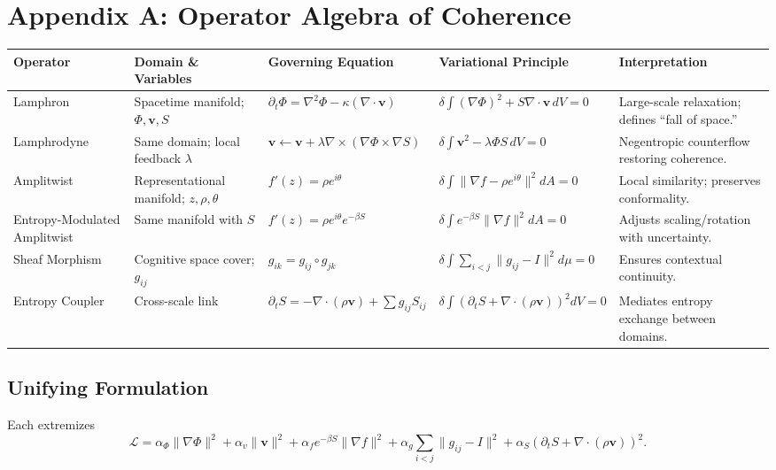 \documentclass[11pt]{article}
\begin{document}
\section*{Appendix A: Operator Algebra of Coherence}
\begin{center}
\begin{tabular}{@{}p{3cm}p{3cm}p{4cm}p{4cm}p{4cm}@{}}
\toprule
\textbf{Operator} & \textbf{Domain \& Variables} & \textbf{Governing Equation} & \textbf{Variational Principle} & \textbf{Interpretation} \\
\midrule
Lamphron & Spacetime manifold; $\Phi, \mathbf{v}, S$ & $\partial_t \Phi = \nabla^2 \Phi - \kappa (\nabla \cdot \mathbf{v})$ & $\delta \!\int (\nabla \Phi)^2 + S \nabla\!\cdot\!\mathbf{v}\,dV = 0$ & Large-scale relaxation; defines ``fall of space.'' \\
Lamphrodyne & Same domain; local feedback $\lambda$ & $\mathbf{v} \leftarrow \mathbf{v} + \lambda \nabla \times (\nabla \Phi \times \nabla S)$ & $\delta \!\int \mathbf{v}^2 - \lambda \Phi S\,dV = 0$ & Negentropic counterflow restoring coherence. \\
Amplitwist & Representational manifold; $z, \rho, \theta$ & $f'(z) = \rho e^{i\theta}$ & $\delta \!\int \|\nabla f - \rho e^{i\theta}\|^2 dA = 0$ & Local similarity; preserves conformality. \\
Entropy-Modulated Amplitwist & Same manifold with $S$ & $f'(z) = \rho e^{i\theta} e^{-\beta S}$ & $\delta \!\int e^{-\beta S} \|\nabla f\|^2 dA = 0$ & Adjusts scaling/rotation with uncertainty. \\
Sheaf Morphism & Cognitive space cover; $g_{ij}$ & $g_{ik} = g_{ij} \circ g_{jk}$ & $\delta \!\int \sum_{i<j}\!\!\|g_{ij}-I\|^2 d\mu = 0$ & Ensures contextual continuity. \\
Entropy Coupler & Cross-scale link & $\partial_t S = -\nabla\!\cdot(\rho \mathbf{v}) + \sum g_{ij} S_{ij}$ & $\delta \!\int (\partial_t S + \nabla\!\cdot(\rho \mathbf{v}))^2 dV = 0$ & Mediates entropy exchange between domains. \\
\bottomrule
\end{tabular}
\end{center}

\subsection*{Unifying Formulation}
Each extremizes 
\[
\mathcal{L} = \alpha_\Phi \|\nabla \Phi\|^2 + \alpha_v \|\mathbf{v}\|^2 + \alpha_f e^{-\beta S} \|\nabla f\|^2 + \alpha_g \sum_{i<j}\|g_{ij}-I\|^2 + \alpha_S (\partial_t S + \nabla \cdot (\rho \mathbf{v}))^2.
\]
\end{document}
